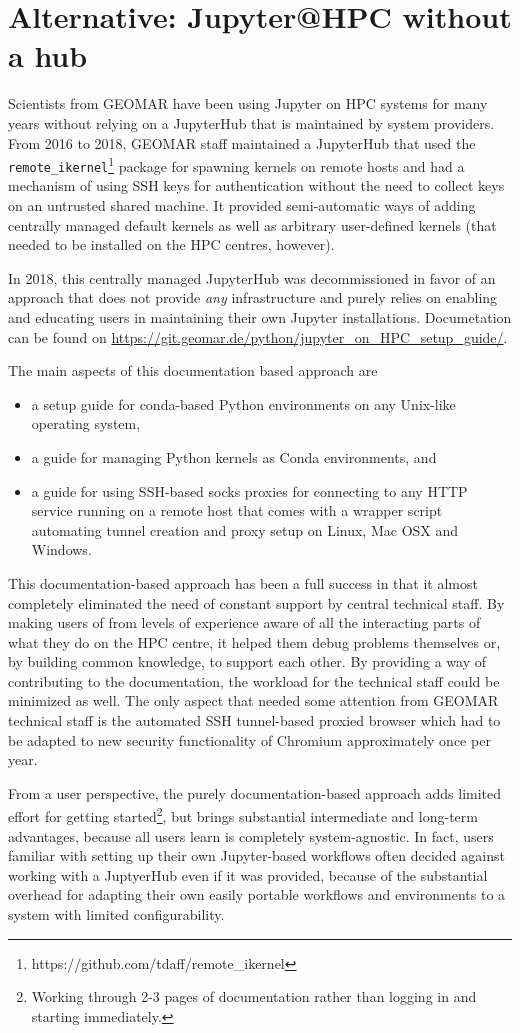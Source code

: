 \section{Alternative: Jupyter@HPC without a hub}

Scientists from GEOMAR have been using Jupyter on HPC systems for many years without relying on a JupyterHub that is maintained by system providers.
From 2016 to 2018, GEOMAR staff maintained a JupyterHub that used the \verb|remote_ikernel|\footnote{https://github.com/tdaff/remote_ikernel} package for spawning kernels on remote hosts and had a mechanism of using SSH keys for authentication without the need to collect keys on an untrusted shared machine.
It provided semi-automatic ways of adding centrally managed default kernels as well as arbitrary user-defined kernels (that needed to be installed on the HPC centres, however).

In 2018, this centrally managed JupyterHub was decommissioned in favor of an approach that does not provide \emph{any} infrastructure and purely relies on enabling and educating users in maintaining their own Jupyter installations.
Documetation can be found on \url{https://git.geomar.de/python/jupyter_on_HPC_setup_guide/}.

The main aspects of this documentation based approach are
\begin{itemize}
    \item a setup guide for conda-based Python environments on any Unix-like operating system,
    \item a guide for managing Python kernels as Conda environments, and
    \item a guide for using SSH-based socks proxies for connecting to any HTTP service running on a remote host that comes with a wrapper script automating tunnel creation and proxy setup on Linux, Mac OSX and Windows.
\end{itemize}

This documentation-based approach has been a full success in that it almost completely eliminated the need of constant support by central technical staff.
By making users of from levels of experience aware of all the interacting parts of what they do on the HPC centre, it helped them debug problems themselves or, by building common knowledge, to support each other.
By providing a way of contributing to the documentation, the workload for the technical staff could be minimized as well.
The only aspect that needed some attention from GEOMAR technical staff is the automated SSH tunnel-based proxied browser which had to be adapted to new security functionality of Chromium approximately once per year.

From a user perspective, the purely documentation-based approach adds limited effort for getting started\footnote{Working through 2-3 pages of documentation rather than logging in and starting immediately.}, but brings substantial intermediate and long-term advantages, because all users learn is completely system-agnostic.
In fact, users familiar with setting up their own Jupyter-based workflows often decided against working with a JuptyerHub even if it was provided, because of the substantial overhead for adapting their own easily portable workflows and environments to a system with limited configurability.
